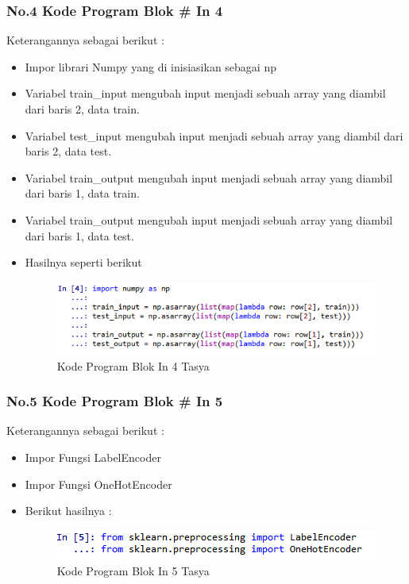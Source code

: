 \subsubsection{No.4 Kode Program Blok \# In 4}

Keterangannya sebagai berikut :\\
\begin{itemize}
\item Impor librari Numpy yang di inisiasikan sebagai np
\item Variabel train\_input mengubah input menjadi sebuah array yang diambil dari baris 2, data train.
\item Variabel test\_input mengubah input menjadi sebuah array yang diambil dari baris 2, data test.
\item Variabel train\_output mengubah input menjadi sebuah array yang diambil dari baris 1, data train.
\item Variabel train\_output mengubah input menjadi sebuah array yang diambil dari baris 1, data test.
\item Hasilnya seperti berikut 
\begin{figure}[ht]
\centering
\includegraphics[scale=0.5]{figures/Chapter 7/1164086/Praktek/chapter7tasya17.png}
\caption{Kode Program Blok In 4 Tasya}
\label{Praktek}
\end{figure}
\end{itemize}

\subsubsection{No.5 Kode Program Blok \# In 5}

Keterangannya sebagai berikut :\\
\begin{itemize}
\item Impor Fungsi LabelEncoder
\item Impor Fungsi OneHotEncoder
\item Berikut hasilnya :\\
\begin{figure}[ht]
\centering
\includegraphics[scale=0.5]{figures/Chapter 7/1164086/Praktek/chapter7tasya18.png}
\caption{Kode Program Blok In 5 Tasya}
\label{Praktek}
\end{figure}
\end{itemize}

